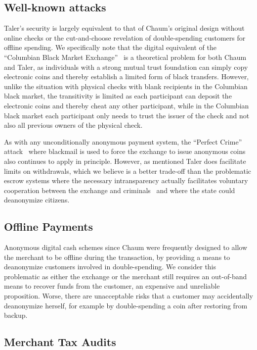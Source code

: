 \documentclass[sigconf, authordraft]{acmart}
\begin{document}
\subsection{Well-known attacks}

Taler's security is largely equivalent to that of Chaum's original
design without online checks or the cut-and-choose revelation of
double-spending customers for offline spending.
We specifically note that the digital equivalent of the ``Columbian
Black Market Exchange''~\cite{fatf1997} is a theoretical problem for
both Chaum and Taler, as individuals with a strong mutual trust
foundation can simply copy electronic coins and thereby establish a
limited form of black transfers.  However, unlike the situation with
physical checks with blank recipients in the Columbian black market,
the transitivity is limited as each participant can deposit the electronic
coins and thereby cheat any other participant, while in the Columbian
black market each participant only needs to trust the issuer of the
check and not also all previous owners of the physical check.

As with any unconditionally anonymous payment system, the ``Perfect
Crime'' attack~\cite{solms1992perfect} where blackmail is used to
force the exchange to issue anonymous coins also continues to apply in
principle.  However, as mentioned Taler does facilitate limits on
withdrawals, which we believe is a better trade-off than the
problematic escrow systems where the necessary intransparency
actually facilitates voluntary cooperation between the exchange and
criminals~\cite{sander1999escrow} and where the state could
deanonymize citizens.

\subsection{Offline Payments} \label{sec:offline}

Anonymous digital cash schemes since Chaum were frequently designed
to allow the merchant to be offline during the transaction,
by providing a means to deanonymize customers involved in
double-spending.  We consider this problematic as either the
exchange or the merchant still requires an out-of-band
means to recover funds from the customer, an expensive and
unreliable proposition.  Worse, there are unacceptable risks that
a customer may accidentally deanonymize herself, for example by
double-spending a coin after restoring from backup.

\subsection{Merchant Tax Audits}
\end{document}
